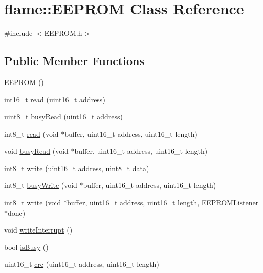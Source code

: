 \hypertarget{classflame_1_1_e_e_p_r_o_m}{\section{flame\-:\-:E\-E\-P\-R\-O\-M Class Reference}
\label{classflame_1_1_e_e_p_r_o_m}
}


{\ttfamily \#include $<$E\-E\-P\-R\-O\-M.\-h$>$}

\subsection*{Public Member Functions}
\begin{DoxyCompactItemize}
\item 
\hyperlink{classflame_1_1_e_e_p_r_o_m_ae2eb20d65e5518bbd9a660c6401dbcf1}{E\-E\-P\-R\-O\-M} ()
\item 
int16\-\_\-t \hyperlink{classflame_1_1_e_e_p_r_o_m_aa8fd4064faa1e2a78b0a8778b50f57be}{read} (uint16\-\_\-t address)
\item 
uint8\-\_\-t \hyperlink{classflame_1_1_e_e_p_r_o_m_acabcdbc11db884db1a2608c580aa84ef}{busy\-Read} (uint16\-\_\-t address)
\item 
int8\-\_\-t \hyperlink{classflame_1_1_e_e_p_r_o_m_a1584e413a8239e8352076fc09e8839bd}{read} (void $\ast$buffer, uint16\-\_\-t address, uint16\-\_\-t length)
\item 
void \hyperlink{classflame_1_1_e_e_p_r_o_m_a2a5c938a08de09bf4e6d8e7926bf4b17}{busy\-Read} (void $\ast$buffer, uint16\-\_\-t address, uint16\-\_\-t length)
\item 
int8\-\_\-t \hyperlink{classflame_1_1_e_e_p_r_o_m_a9479e07e880667dad49289bbb00b9261}{write} (uint16\-\_\-t address, uint8\-\_\-t data)
\item 
int8\-\_\-t \hyperlink{classflame_1_1_e_e_p_r_o_m_a24dc038468425385ed0bef8375d6c266}{busy\-Write} (void $\ast$buffer, uint16\-\_\-t address, uint16\-\_\-t length)
\item 
int8\-\_\-t \hyperlink{classflame_1_1_e_e_p_r_o_m_afd4f04c1685e611f5e752cd8ae396857}{write} (void $\ast$buffer, uint16\-\_\-t address, uint16\-\_\-t length, \hyperlink{classflame_1_1_e_e_p_r_o_m_listener}{E\-E\-P\-R\-O\-M\-Listener} $\ast$done)
\item 
void \hyperlink{classflame_1_1_e_e_p_r_o_m_aa39e6c43fddfc93bd8a3ee59e36609c3}{write\-Interrupt} ()
\item 
bool \hyperlink{classflame_1_1_e_e_p_r_o_m_a7ad2ec5185aeeffe7b06820b0cde8abf}{is\-Busy} ()
\item 
uint16\-\_\-t \hyperlink{classflame_1_1_e_e_p_r_o_m_a5b24aa67d9fd4ccbac79601670505d33}{crc} (uint16\-\_\-t address, uint16\-\_\-t length)
\end{DoxyCompactItemize}


